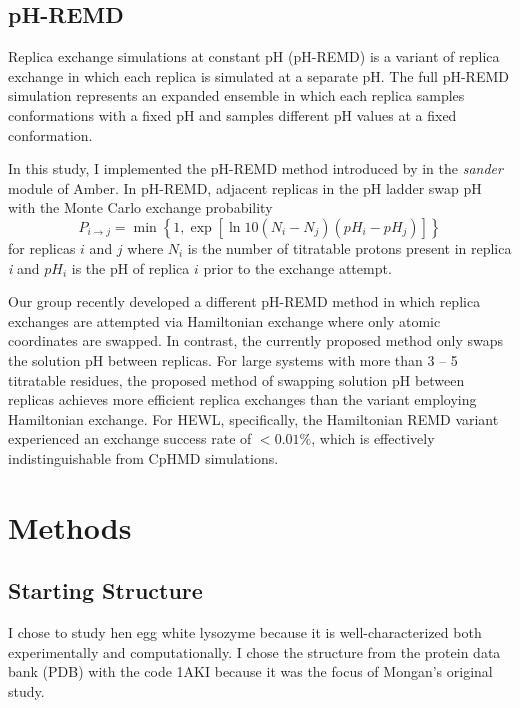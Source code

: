 \subsection{pH-REMD}

Replica exchange simulations at constant pH (pH-REMD) is a variant of replica
exchange in which each replica is simulated at a separate pH. The full pH-REMD
simulation represents an expanded ensemble in which each replica samples
conformations with a fixed pH and samples different pH values at a fixed
conformation.

In this study, I implemented the pH-REMD method introduced by
\citeauthor{Itoh_Proteins_2011_v79_p3420} \cite{Itoh_Proteins_2011_v79_p3420} in
the \emph{sander} module of Amber.  \cite{AMBER12} In pH-REMD, adjacent replicas
in the pH ladder swap pH with the Monte Carlo exchange probability
\begin{equation}
   P _ {i \rightarrow j} = \min \left \lbrace 1, \exp \left[ \ln 10 \left( N _ i
            - N _ j \right) \left( pH_i - pH_j \right) \right] \right \rbrace
   \label{eq3:ExchSucc}
\end{equation}
for replicas $i$ and $j$ where $N_i$ is the number of titratable protons present
in replica \emph{i} and $pH_i$ is the pH of replica $i$ prior to the exchange
attempt.

Our group recently developed a different pH-REMD method in which replica
exchanges are attempted via Hamiltonian exchange where only atomic coordinates
are swapped. \cite{Dashti_JPhysChemB_2012_v116_p8805} In contrast, the currently
proposed method only swaps the solution pH between replicas. For large systems
with more than 3 -- 5 titratable residues, the proposed method of swapping
solution pH between replicas achieves more efficient replica exchanges than the
variant employing Hamiltonian exchange. For HEWL, specifically, the Hamiltonian
REMD variant experienced an exchange success rate of $<0.01\%$, which is
effectively indistinguishable from CpHMD simulations.

\section{Methods}

\subsection{Starting Structure}

I chose to study hen egg white lysozyme because it is well-characterized both
experimentally \cite{Takahashi_Biopolymers_1992_v32_p897,
Bartik_BiophysJ_1994_v66_p1180, Webb_Proteins_2011_v79_p685} and
computationally. \cite{Mongan_JComputChem_2004_v25_p2038,
Demchuk_JPhysChem_1996_v100_p17373, Wallace_JChemTheoryComput_2011_v7_p2617} I
chose the structure from the protein data bank (PDB) with the code 1AKI
\cite{Artymiuk_ActaCrystB_1982_v38_p778} because it was the focus of Mongan's
original study. \cite{Mongan_JComputChem_2004_v25_p2038}

